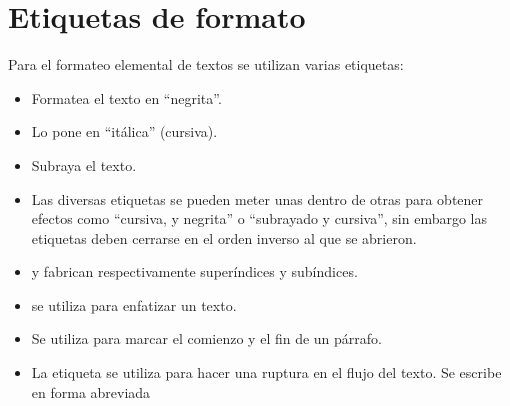 \documentclass[letterpaper,10pt,spanish]{sphinxmanual}
\begin{document}
\section{Etiquetas de formato}
\label{tema2:etiquetas-de-formato}
Para el formateo elemental de textos se utilizan varias etiquetas:
\begin{itemize}
\item {} 
 Formatea el texto en “negrita”.

\item {} 
 Lo pone en “itálica” (cursiva).

\item {} 
 Subraya el texto.

\item {} 
Las diversas etiquetas se pueden meter unas dentro de otras para obtener efectos como “cursiva, y negrita” o “subrayado y cursiva”, sin embargo las etiquetas deben cerrarse en el orden inverso al que se abrieron.

\item {} 
 y  fabrican respectivamente superíndices y subíndices.

\item {} 
 se utiliza para enfatizar un texto.

\item {} 
 Se utiliza para marcar el comienzo y el fin de un párrafo.

\item {} 
La etiqueta  se utiliza para hacer una ruptura en el flujo del texto. Se escribe en forma abreviada 

\end{itemize}
\end{document}

